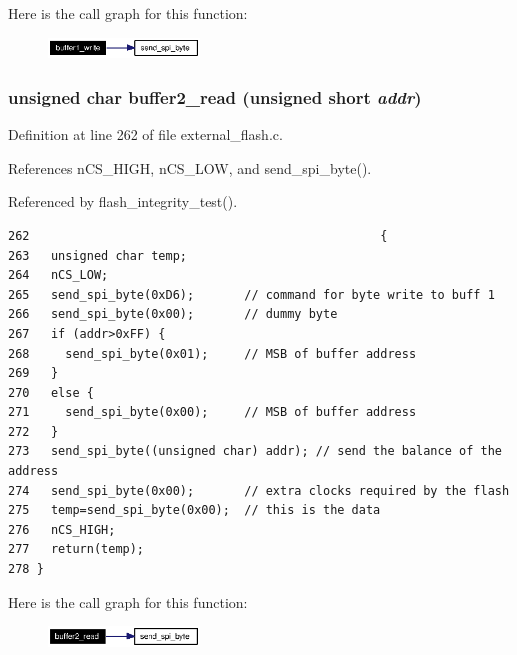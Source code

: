 Here is the call graph for this function:\begin{figure}[H]
\begin{center}
\leavevmode
\includegraphics[width=114pt]{external__flash_8c_a7_cgraph}
\end{center}
\end{figure}
\subsubsection{\setlength{\rightskip}{0pt plus 5cm}unsigned char buffer2\_\-read (unsigned short {\em addr})}\label{external__flash_8c_a10}




Definition at line 262 of file external\_\-flash.c.

References n\-CS\_\-HIGH, n\-CS\_\-LOW, and send\_\-spi\_\-byte().

Referenced by flash\_\-integrity\_\-test().

\footnotesize\begin{verbatim}262                                                 {
263   unsigned char temp;
264   nCS_LOW;
265   send_spi_byte(0xD6);       // command for byte write to buff 1
266   send_spi_byte(0x00);       // dummy byte
267   if (addr>0xFF) {
268     send_spi_byte(0x01);     // MSB of buffer address
269   }
270   else {
271     send_spi_byte(0x00);     // MSB of buffer address
272   }  
273   send_spi_byte((unsigned char) addr); // send the balance of the address
274   send_spi_byte(0x00);       // extra clocks required by the flash
275   temp=send_spi_byte(0x00);  // this is the data 
276   nCS_HIGH; 
277   return(temp);
278 }
\end{verbatim}\normalsize 




Here is the call graph for this function:\begin{figure}[H]
\begin{center}
\leavevmode
\includegraphics[width=114pt]{external__flash_8c_a10_cgraph}
\end{center}
\end{figure}

